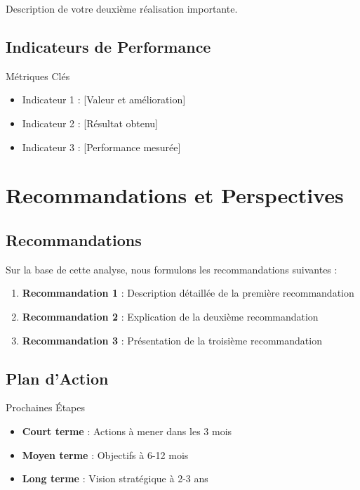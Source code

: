\documentclass{modern-report}
\begin{document}
Description de votre deuxième réalisation importante.

\modernseparator

\section{Indicateurs de Performance}

\begin{modernbox}{Métriques Clés}
\begin{itemize}
    \item Indicateur 1 : [Valeur et amélioration]
    \item Indicateur 2 : [Résultat obtenu]
    \item Indicateur 3 : [Performance mesurée]
\end{itemize}
\end{modernbox}

\chapter{Recommandations et Perspectives}

\section{Recommandations}

Sur la base de cette analyse, nous formulons les recommandations suivantes :

\begin{enumerate}
    \item \textbf{Recommandation 1} : Description détaillée de la première recommandation
    \item \textbf{Recommandation 2} : Explication de la deuxième recommandation
    \item \textbf{Recommandation 3} : Présentation de la troisième recommandation
\end{enumerate}

\section{Plan d'Action}

\begin{infobox}{Prochaines Étapes}
\begin{itemize}
    \item \textbf{Court terme} : Actions à mener dans les 3 mois
    \item \textbf{Moyen terme} : Objectifs à 6-12 mois
    \item \textbf{Long terme} : Vision stratégique à 2-3 ans
\end{itemize}
\end{infobox}
\end{document}
